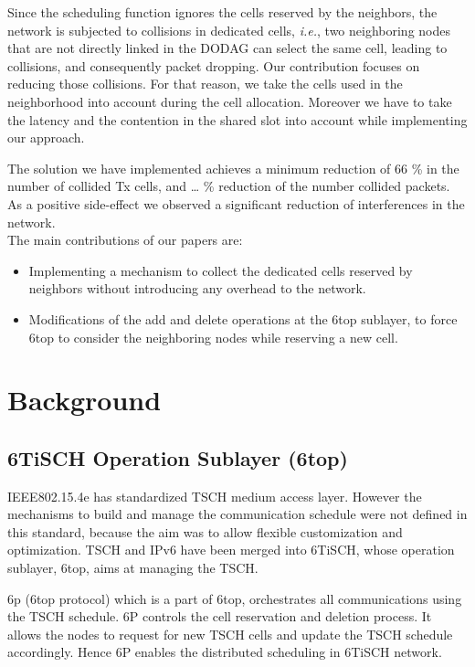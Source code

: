 \documentclass[10pt, conference, compsocconf]{IEEEtran}
\begin{document}
Since the scheduling function ignores the cells reserved by the neighbors, the network is subjected to collisions in dedicated cells, {\em i.e.}, two neighboring nodes that are not directly linked in the DODAG can select the same cell, leading to collisions, and consequently packet dropping. Our contribution focuses on reducing those collisions. For that reason, we take the cells used in the neighborhood into account during the cell allocation. Moreover we have to take the latency and the contention in the shared slot into account while implementing our approach.

The solution we have implemented achieves a minimum reduction of 66 \% in the number of collided Tx cells, and … \% reduction of the number collided packets. As a positive side-effect we observed a significant reduction of interferences in the network. \\

The main contributions of our papers are:

\begin{itemize}
\item Implementing a mechanism to collect the dedicated cells reserved by neighbors without introducing any overhead to the network. 
\item Modifications of the add and delete operations at the 6top sublayer, to force 6top to consider the neighboring nodes while reserving a new cell.
\end{itemize}

\section{Background}

\subsection{6TiSCH Operation Sublayer (6top)} 

IEEE802.15.4e has standardized TSCH medium access layer. However the mechanisms to build and manage the communication schedule were not defined in this standard, because the aim was to allow flexible customization and optimization. TSCH and IPv6 have been merged into 6TiSCH, whose operation sublayer, 6top, aims at managing the TSCH.

6p (6top protocol) which is a part of 6top, orchestrates all communications using the TSCH schedule. 6P controls the cell reservation and deletion process. It allows the nodes to request for new TSCH cells and update the TSCH schedule accordingly. Hence 6P enables the distributed scheduling in 6TiSCH network.
\end{document}
